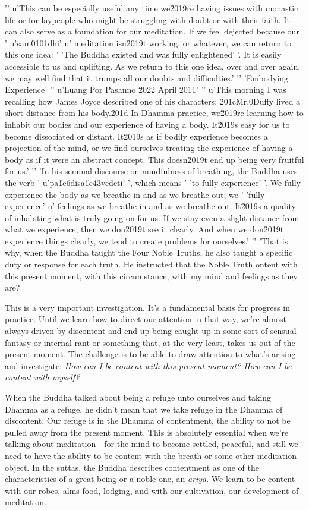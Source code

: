 {'\n'
u'This can be especially useful any time we\u2019re having issues with monastic life or for laypeople who might be struggling with doubt or with their faith. It can also serve as a foundation for our meditation. If we feel dejected because our '
u'sam\u0101dhi'
u' meditation isn\u2019t working, or whatever, we can return to this one idea: '
'The Buddha existed and was fully enlightened'
'. It is easily accessible to us and uplifting. As we return to this one idea, over and over again, we may well find that it trumps all our doubts and difficulties.'
'\n'
'Embodying Experience'
'\n'
u'Luang Por Pasanno \u2022 April 2011'
'\n'
u'This morning I was recalling how James Joyce described one of his characters: \u201cMr.\xa0Duffy lived a short distance from his body.\u201d In Dhamma practice, we\u2019re learning how to inhabit our bodies and our experience of having a body. It\u2019s easy for us to become dissociated or distant. It\u2019s as if bodily experience becomes a projection of the mind, or we find ourselves treating the experience of having a body as if it were an abstract concept. This doesn\u2019t end up being very fruitful for us.'
'\n'
'In his seminal discourse on mindfulness of breathing, the Buddha uses the verb '
u'pa\u1e6disa\u1e43vedeti'
', which means '
'to fully experience'
'. We fully experience the body as we breathe in and as we breathe out; we '
'fully experience'
u' feelings as we breathe in and as we breathe out. It\u2019s a quality of inhabiting what is truly going on for us. If we stay even a slight distance from what we experience, then we don\u2019t see it clearly. And when we don\u2019t experience things clearly, we tend to create problems for ourselves.'
'\n'
'That is why, when the Buddha taught the Four Noble Truths, he also taught a specific duty or response for each truth. He instructed that the Noble Truth ontent with this present moment, 
with this circumstance, with my mind and feelings as they are?}

This is a very important investigation. It's a fundamental basis for 
progress in practice. Until we learn how to direct our attention in 
that way, we're almost always driven by discontent and end up being 
caught up in some sort of sensual fantasy or internal rant or something 
that, at the very least, takes us out of the present moment. The 
challenge is to be able to draw attention to what's arising and 
investigate: \emph{How can I be content with this present moment? How 
can I be content with myself?}

When the Buddha talked about being a refuge unto ourselves and taking 
Dhamma as a refuge, he didn't mean that we take refuge in the Dhamma of 
discontent. Our refuge is in the Dhamma of contentment, the ability to 
not be pulled away from the present moment. This is absolutely 
essential when we're talking about meditation---for the mind to become 
settled, peaceful, and still we need to have the ability to be content 
with the breath or some other meditation object. In the suttas, the 
Buddha describes contentment as one of the characteristics of a great 
being or a noble one, an \emph{ariya}. We learn to be content with our 
robes, alms food, lodging, and with our cultivation, our development of 
meditation.

